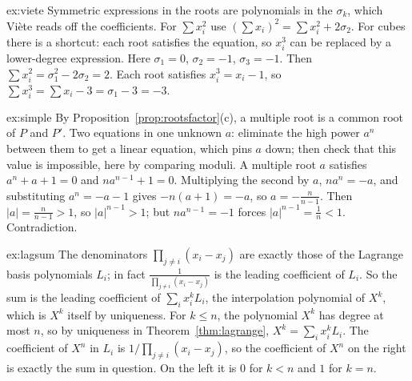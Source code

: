 \begin{solution}{ex:viete}
\idea Symmetric expressions in the roots are polynomials in the $\sigma_k$, which Vi\`ete reads off the coefficients. For $\sum x_i^2$ use $(\sum x_i)^2=\sum x_i^2+2\sigma_2$. For cubes there is a shortcut: each root satisfies the equation, so $x_i^3$ can be replaced by a lower-degree expression.
\writeup Here $\sigma_1=0$, $\sigma_2=-1$, $\sigma_3=-1$. Then $\sum x_i^2=\sigma_1^2-2\sigma_2=2$. Each root satisfies $x_i^3=x_i-1$, so
$\sum x_i^3=\sum x_i-3=\sigma_1-3=-3$.
\end{solution}

\begin{solution}{ex:simple}
\idea By Proposition~\ref{prop:rootsfactor}(c), a multiple root is a common root of $P$ and $P'$. Two equations in one unknown $a$: eliminate the high power $a^n$ between them to get a linear equation, which pins $a$ down; then check that this value is impossible, here by comparing moduli.
\writeup A multiple root $a$ satisfies $a^n+a+1=0$ and $na^{n-1}+1=0$. Multiplying the second by $a$, $na^n=-a$, and substituting $a^n=-a-1$ gives
$-n(a+1)=-a$, so $a=-\frac n{n-1}$. Then $|a|=\frac n{n-1}>1$, so $|a|^{n-1}>1$; but $na^{n-1}=-1$ forces $|a|^{n-1}=\frac1n<1$. Contradiction.
\end{solution}

\begin{solution}{ex:lagsum}
\idea The denominators $\prod_{j\ne i}(x_i-x_j)$ are exactly those of the Lagrange basis polynomials $L_i$; in fact $\frac1{\prod_{j\ne i}(x_i-x_j)}$ is the leading coefficient of $L_i$. So the sum is the leading coefficient of $\sum_ix_i^kL_i$, the interpolation polynomial of $X^k$, which is $X^k$ itself by uniqueness.
\writeup For $k\le n$, the polynomial $X^k$ has degree at most $n$, so by uniqueness in Theorem~\ref{thm:lagrange}, $X^k=\sum_ix_i^kL_i$.
The coefficient of $X^n$ in $L_i$ is $1/\prod_{j\ne i}(x_i-x_j)$, so the coefficient of $X^n$ on the right is exactly the sum in question.
On the left it is $0$ for $k<n$ and $1$ for $k=n$.
\end{solution}

